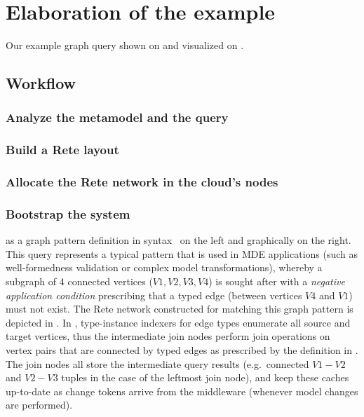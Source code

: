 \section{Elaboration of the example}
\label{sec:elaboration}

Our example graph query shown on  and visualized on . 


\subsection{}



\subsection{Workflow}


\subsubsection{Analyze the metamodel and the query}


\subsubsection{Build a Rete layout}


\subsubsection{Allocate the Rete network in the cloud's nodes} 




\subsubsection{Bootstrap the system}
 


 
as a graph pattern definition in \eiq{} syntax~\cite{Bergmann:2010:IEM:1926458.1926467} on the left and graphically on the right. This query represents a typical pattern that is used in MDE applications (such as well-formedness validation or complex model transformations), whereby a subgraph of 4 connected vertices ($V1, V2, V3, V4$) is sought after with a \emph{negative application condition} prescribing that a typed edge (between vertices $V4$ and $V1$) must not exist.
The Rete network constructed for matching this graph pattern is depicted in . In \iqd{}, type-instance indexers for edge types enumerate all source and target vertices, thus the intermediate join nodes perform join operations on vertex pairs that are connected by typed edges as prescribed by the definition in . The join nodes all store the intermediate query results (e.g.\ connected $V1-V2$ and $V2-V3$ tuples in the case of the leftmost join node), and keep these caches up-to-date as change tokens arrive from the middleware (whenever model changes are performed).


